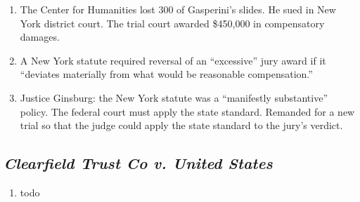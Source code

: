 \begin{enumerate}
    \item The Center for Humanities lost 300 of Gasperini's slides. He sued in 
    New York district court. The trial court awarded \$450,000 in compensatory 
    damages.
    \item A New York statute required reversal of an ``excessive'' jury award 
    if it ``deviates materially from what would be reasonable compensation.''
    \item Justice Ginsburg: the New York statute was a ``manifestly 
    substantive'' policy. The federal court must apply the state standard.  
    Remanded for a new trial so that the judge could apply the state standard 
    to the jury's verdict.
\end{enumerate}

\subsection{\emph{Clearfield Trust Co v. United States}}

\begin{enumerate}
    \item todo
\end{enumerate}
